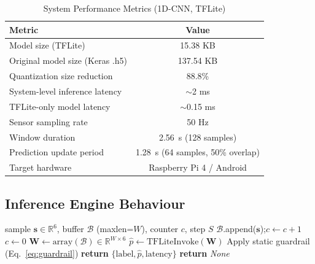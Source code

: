 \documentclass[12pt,a4paper]{article}
\begin{document}
\begin{table}[!ht]
\renewcommand{\arraystretch}{1.3}
\caption{System Performance Metrics (1D-CNN, TFLite)}
\label{tab:system_performance}
\centering
\begin{tabular}{lc}
\toprule
\textbf{Metric} & \textbf{Value} \\
\midrule
Model size (TFLite)             & 15.38 KB \\
Original model size (Keras .h5) & 137.54 KB \\
Quantization size reduction     & 88.8\% \\
System-level inference latency  & $\sim$2 ms \\
TFLite-only model latency       & $\sim$0.15 ms \\
Sensor sampling rate            & 50 Hz \\
Window duration                 & 2.56~s (128 samples) \\
Prediction update period        & 1.28~s (64 samples, 50\% overlap) \\
Target hardware                 & Raspberry Pi 4 / Android \\
\bottomrule
\end{tabular}
\end{table}

\subsection{Inference Engine Behaviour}

\begin{algorithm}[!ht]
\caption{FallDetectionEngine: push\_sample() Logic}
\label{alg:inference}
\begin{algorithmic}[1]
\Require sample $\mathbf{s}\in\mathbb{R}^6$, buffer $\mathcal{B}$
  (maxlen=$W$), counter $c$, step $S$
\State $\mathcal{B}$.append($\mathbf{s}$);\;$c\leftarrow c+1$
  \State $c\leftarrow0$
  \State $\mathbf{W}\leftarrow\text{array}(\mathcal{B})\in\mathbb{R}^{W\times6}$
  \State $\hat{p}\leftarrow\text{TFLiteInvoke}(\mathbf{W})$
  \State Apply static guardrail (Eq.~\ref{eq:guardrail})
  \State \textbf{return} $\{\text{label},\hat{p},\text{latency}\}$
\EndIf
\State \textbf{return} \textit{None}
\end{algorithmic}
\end{algorithm}
\end{document}
